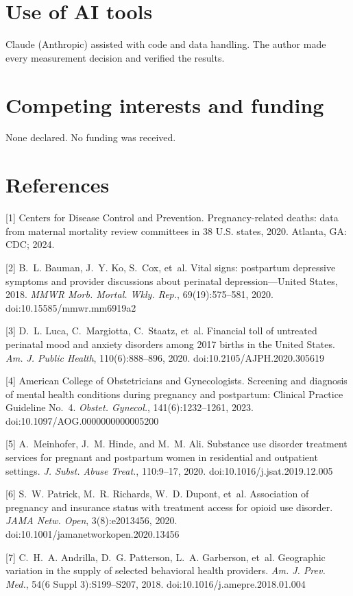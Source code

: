 \documentclass{article}
\begin{document}
\section*{Use of AI tools}
Claude (Anthropic) assisted with code and data handling. The author made every measurement decision and verified the results.

\section*{Competing interests and funding}
None declared. No funding was received.

\section*{References}

[1] Centers for Disease Control and Prevention. Pregnancy-related deaths: data from maternal mortality review committees in 38 U.S. states, 2020. Atlanta, GA: CDC; 2024.

[2] B.~L. Bauman, J.~Y. Ko, S.~Cox, et~al. Vital signs: postpartum depressive symptoms and provider discussions about perinatal depression---United States, 2018. \emph{MMWR Morb. Mortal. Wkly. Rep.}, 69(19):575--581, 2020. doi:10.15585/mmwr.mm6919a2

[3] D.~L. Luca, C.~Margiotta, C.~Staatz, et~al. Financial toll of untreated perinatal mood and anxiety disorders among 2017 births in the United States. \emph{Am. J. Public Health}, 110(6):888--896, 2020. doi:10.2105/AJPH.2020.305619

[4] American College of Obstetricians and Gynecologists. Screening and diagnosis of mental health conditions during pregnancy and postpartum: Clinical Practice Guideline No.~4. \emph{Obstet. Gynecol.}, 141(6):1232--1261, 2023. doi:10.1097/AOG.0000000000005200

[5] A.~Meinhofer, J.~M. Hinde, and M.~M. Ali. Substance use disorder treatment services for pregnant and postpartum women in residential and outpatient settings. \emph{J. Subst. Abuse Treat.}, 110:9--17, 2020. doi:10.1016/j.jsat.2019.12.005

[6] S.~W. Patrick, M.~R. Richards, W.~D. Dupont, et~al. Association of pregnancy and insurance status with treatment access for opioid use disorder. \emph{JAMA Netw. Open}, 3(8):e2013456, 2020. doi:10.1001/jamanetworkopen.2020.13456

[7] C.~H.~A. Andrilla, D.~G. Patterson, L.~A. Garberson, et~al. Geographic variation in the supply of selected behavioral health providers. \emph{Am. J. Prev. Med.}, 54(6 Suppl 3):S199--S207, 2018. doi:10.1016/j.amepre.2018.01.004
\end{document}
